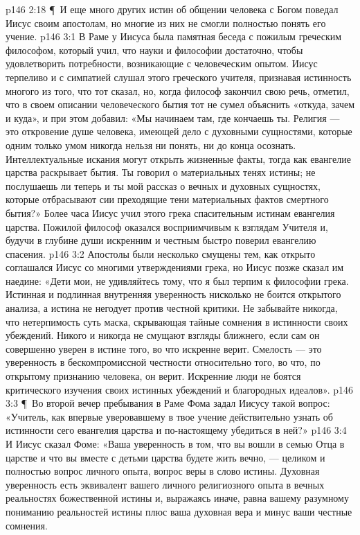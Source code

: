 \vs p146 2:18 \P\ И еще много других истин об общении человека с Богом поведал Иисус своим апостолам, но многие из них не смогли полностью понять его учение.
\vs p146 3:1 В Раме у Иисуса была памятная беседа с пожилым греческим философом, который учил, что науки и философии достаточно, чтобы удовлетворить потребности, возникающие с человеческим опытом. Иисус терпеливо и с симпатией слушал этого греческого учителя, признавая истинность многого из того, что тот сказал, но, когда философ закончил свою речь, отметил, что в своем описании человеческого бытия тот не сумел объяснить «откуда, зачем и куда», и при этом добавил: «Мы начинаем там, где кончаешь ты. Религия --- это откровение душе человека, имеющей дело с духовными сущностями, которые одним только умом никогда нельзя ни понять, ни до конца осознать. Интеллектуальные искания могут открыть жизненные факты, тогда как евангелие царства раскрывает  бытия. Ты говорил о материальных тенях истины; не послушаешь ли теперь и ты мой рассказ о вечных и духовных сущностях, которые отбрасывают сии преходящие тени материальных фактов смертного бытия?» Более часа Иисус учил этого грека спасительным истинам евангелия царства. Пожилой философ оказался восприимчивым к взглядам Учителя и, будучи в глубине души искренним и честным быстро поверил евангелию спасения.
\vs p146 3:2 Апостолы были несколько смущены тем, как открыто соглашался Иисус со многими утверждениями грека, но Иисус позже сказал им наедине: «Дети мои, не удивляйтесь тому, что я был терпим к философии грека. Истинная и подлинная внутренняя уверенность нисколько не боится открытого анализа, а истина не негодует против честной критики. Не забывайте никогда, что нетерпимость суть маска, скрывающая тайные сомнения в истинности своих убеждений. Никого и никогда не смущают взгляды ближнего, если сам он совершенно уверен в истине того, во что искренне верит. Смелость --- это уверенность в бескомпромиссной честности относительно того, во что, по открытому признанию человека, он верит. Искренние люди не боятся критического изучения своих истинных убеждений и благородных идеалов».
\vs p146 3:3 \P\ Во второй вечер пребывания в Раме Фома задал Иисусу такой вопрос: «Учитель, как впервые уверовавшему в твое учение действительно узнать об истинности сего евангелия царства и по\hyp{}настоящему убедиться в ней?»
\vs p146 3:4 И Иисус сказал Фоме: «Ваша уверенность в том, что вы вошли в семью Отца в царстве и что вы вместе с детьми царства будете жить вечно, --- целиком и полностью вопрос личного опыта, вопрос веры в слово истины. Духовная уверенность есть эквивалент вашего личного религиозного опыта в вечных реальностях божественной истины и, выражаясь иначе, равна вашему разумному пониманию реальностей истины плюс ваша духовная вера и минус ваши честные сомнения.
